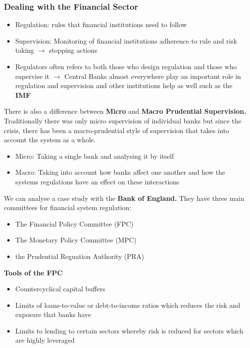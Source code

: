 \documentclass[12pt, letterpaper]{article}
\begin{document}
\subsubsection{Dealing with the Financial Sector}
\begin{itemize}
	\item Regulation: rules that financial institutions need to follow
	\item Supervision: Monitoring of financial institutions adherence to rule and risk taking $\rightarrow$ stopping actions
	\item Regulators often refers to both those who design regulation and those who supervise it $\rightarrow$ Central Banks almost everywhere play an important role in regulation and supervision and other institutions help as well such as the \textbf{IMF}
\end{itemize}
There is also a difference between \textbf{Micro} and \textbf{Macro Prudential Supervision.} Traditionally there was only micro supervision of individual banks but since the crisis, there has been a macro-prudential style of supervision that takes into account the system as a whole.
\begin{itemize}
	\item Micro: Taking a single bank and analysing it by itself
	\item Macro: Taking into account how banks affect one another and how the systems regulations have an effect on these interactions \\
\end{itemize}
We can analyse a case study with the \textbf{Bank of England.} They have three main committees for financial system regulation:
\begin{itemize}
	\item The Financial Policy Committee (FPC)
	\item The Monetary Policy Committee (MPC)
	\item the Prudential Reguation Authority (PRA)
\end{itemize}
\textbf{Tools of the FPC}\\
\begin{itemize}
	\item Countercyclical capital buffers
	\item Limits of loans-to-value or debt-to-income ratios which reduces the risk and exposure that banks have
	\item Limits to lending to certain sectors whereby risk is reduced for sectors which are highly leveraged
\end{itemize}
\end{document}
